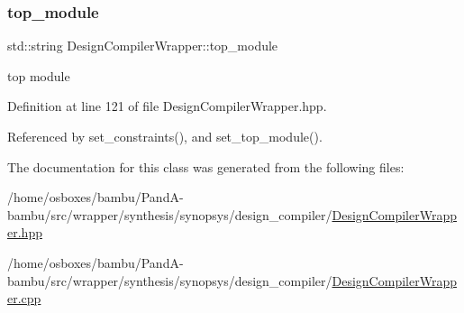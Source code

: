 \subsubsection{\texorpdfstring{top\+\_\+module}{top\_module}}
{\footnotesize\ttfamily std\+::string Design\+Compiler\+Wrapper\+::top\+\_\+module\hspace{0.3cm}{\ttfamily [protected]}}



top module 



Definition at line 121 of file Design\+Compiler\+Wrapper.\+hpp.



Referenced by set\+\_\+constraints(), and set\+\_\+top\+\_\+module().



The documentation for this class was generated from the following files\+:\begin{DoxyCompactItemize}
\item 
/home/osboxes/bambu/\+Pand\+A-\/bambu/src/wrapper/synthesis/synopsys/design\+\_\+compiler/\hyperlink{DesignCompilerWrapper_8hpp}{Design\+Compiler\+Wrapper.\+hpp}\item 
/home/osboxes/bambu/\+Pand\+A-\/bambu/src/wrapper/synthesis/synopsys/design\+\_\+compiler/\hyperlink{DesignCompilerWrapper_8cpp}{Design\+Compiler\+Wrapper.\+cpp}\end{DoxyCompactItemize}

